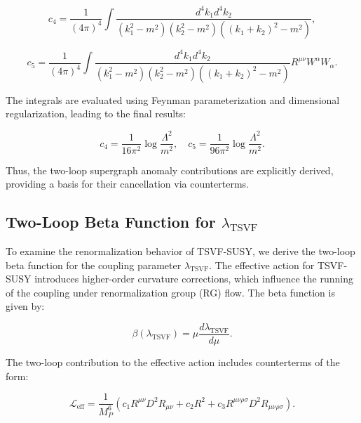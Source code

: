 \documentclass[12pt, onecolumn]{article}
\theoremstyle{definition}
\numberwithin{equation}{section}
\begin{document}
\begin{equation}
c_4 = \frac{1}{(4\pi)^4} \int \frac{d^4k_1 d^4k_2}{(k_1^2 - m^2)(k_2^2 - m^2)((k_1 + k_2)^2 - m^2)},
\label{eq:c4-integral}
\end{equation}

\begin{equation}
c_5 = \frac{1}{(4\pi)^4} \int \frac{d^4k_1 d^4k_2}{(k_1^2 - m^2)(k_2^2 - m^2)((k_1 + k_2)^2 - m^2)} R^{\mu\nu} W^{\alpha} W_{\alpha}.
\label{eq:c5-integral}
\end{equation}

The integrals are evaluated using Feynman parameterization and dimensional regularization, leading to the final results:

\begin{equation}
c_4 = \frac{1}{16\pi^2} \log \frac{\Lambda^2}{m^2}, \quad c_5 = \frac{1}{96\pi^2} \log \frac{\Lambda^2}{m^2}.
\label{eq:c4-c5-results}
\end{equation}

Thus, the two-loop supergraph anomaly contributions are explicitly derived, providing a basis for their cancellation via counterterms.

\subsection{Two-Loop Beta Function for \texorpdfstring{$\lambda_{\text{TSVF}}$}{lambda TSVF}}

\label{subsec:two-loop-beta-function}

To examine the renormalization behavior of TSVF-SUSY, we derive the two-loop beta function for the coupling parameter \( \lambda_{\text{TSVF}} \). The effective action for TSVF-SUSY introduces higher-order curvature corrections, which influence the running of the coupling under renormalization group (RG) flow. The beta function is given by:

\begin{equation}
    \beta(\lambda_{\text{TSVF}}) = \mu \frac{d\lambda_{\text{TSVF}}}{d\mu}.
    \label{eq:beta-function-def}
\end{equation}

The two-loop contribution to the effective action includes counterterms of the form:

\begin{equation}
    \mathcal{L}_{\text{eff}} = \frac{1}{M_P^6} \left( c_1 R^{\mu\nu} D^2 R_{\mu\nu} + c_2 R^2 + c_3 R^{\mu\nu\rho\sigma} D^2 R_{\mu\nu\rho\sigma} \right).
    \label{eq:effective-action-beta}
\end{equation}
\end{document}
